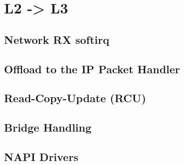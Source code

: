 \section{L2 -> L3}

\subsection{Network RX softirq}

\subsection{Offload to the IP Packet Handler}

\subsection{Read-Copy-Update (RCU)}

\subsection{Bridge Handling}

\subsection{NAPI Drivers}
